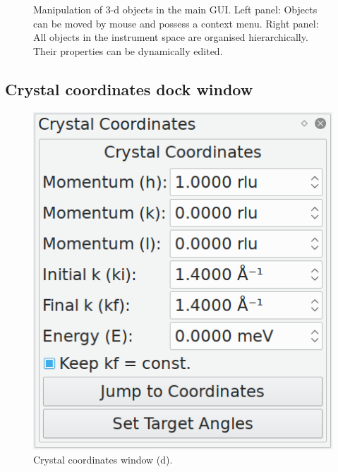 \begin{figure}[htb]
\begin{minipage}{0.5 \textwidth}
\begin{center}
		\end{center}
	\end{minipage}
	\caption[Object manipulation.]{Manipulation of 3-d objects in the main GUI.
		Left panel: Objects can be moved by mouse and possess a context menu.
		Right panel: All objects in the instrument space are organised hierarchically. 
			Their properties can be dynamically edited.
		\label{fig:gui_objects}}
\end{figure}



\subsection{Crystal coordinates dock window}
\label{sec:gui_xtalcoords}
\begin{minipage}{1 \textwidth}
\setlength{\intextsep}{0.25cm}
\begin{figure}
	\vspace{-0.25cm}
	\includegraphics[width = 0.25 \textwidth]{figures/gui_xtalcoords}
	\caption[Crystal coordinates window.]{Crystal coordinates window (d).
		\label{fig:gui_xtalcoords}}
\end{figure}


\end{minipage}
